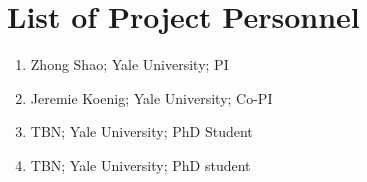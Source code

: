 \documentclass[12pt]{article}
\begin{document}
\thispagestyle{empty}

\section*{List of Project Personnel}

\begin{enumerate}
\item Zhong Shao; Yale University; PI
\item Jeremie Koenig; Yale University; Co-PI
\item TBN; Yale University; PhD Student
\item TBN; Yale University; PhD student
\end{enumerate}
\end{document}

